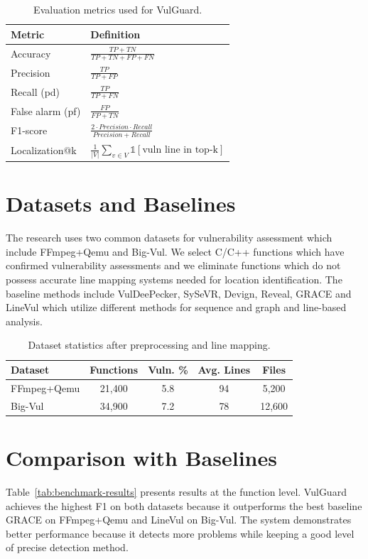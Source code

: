 \begin{table}[htbp]
\centering
\renewcommand{\arraystretch}{1.2}
\begin{tabular}{l|l}
\hline
\textbf{Metric} & \textbf{Definition} \\
\hline
Accuracy & $\frac{TP + TN}{TP + TN + FP + FN}$ \\
Precision & $\frac{TP}{TP + FP}$ \\
Recall (pd) & $\frac{TP}{TP + FN}$ \\
False alarm (pf) & $\frac{FP}{FP + TN}$ \\
F1-score & $\frac{2 \cdot Precision \cdot Recall}{Precision + Recall}$ \\
Localization@k & $\frac{1}{|V|} \sum_{v \in V} \mathbb{1}[\text{vuln line in top-k}]$ \\
\hline
\end{tabular}
\caption{Evaluation metrics used for VulGuard.}
\label{tab:metrics}
\end{table}

\section{Datasets and Baselines}
The research uses two common datasets for vulnerability assessment which include FFmpeg+Qemu and Big-Vul. We select C/C++ functions which have confirmed vulnerability assessments and we eliminate functions which do not possess accurate line mapping systems needed for location identification. The baseline methods include VulDeePecker, SySeVR, Devign, Reveal, GRACE and LineVul which utilize different methods for sequence and graph and line-based analysis.

\begin{table}[htbp]
\centering
\renewcommand{\arraystretch}{1.15}
\begin{tabular}{l|c|c|c|c}
\hline
\textbf{Dataset} & \textbf{Functions} & \textbf{Vuln. \%} & \textbf{Avg. Lines} & \textbf{Files} \\
\hline
FFmpeg+Qemu & 21,400 & 5.8 & 94 & 5,200 \\
Big-Vul & 34,900 & 7.2 & 78 & 12,600 \\
\hline
\end{tabular}
\caption{Dataset statistics after preprocessing and line mapping.}
\label{tab:dataset-stats}
\end{table}

\section{Comparison with Baselines}
Table~\ref{tab:benchmark-results} presents results at the function level. VulGuard achieves the highest F1 on both datasets because it outperforms the best baseline GRACE on FFmpeg+Qemu and LineVul on Big-Vul. The system demonstrates better performance because it detects more problems while keeping a good level of precise detection method.


